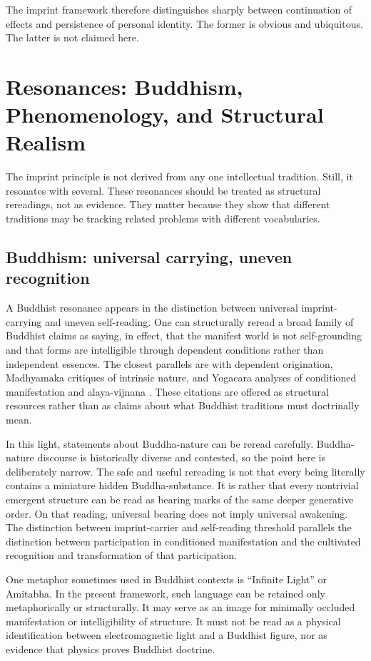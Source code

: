 \documentclass[12pt]{article}
\begin{document}
The imprint framework therefore distinguishes sharply between continuation of effects and persistence of personal identity. The former is obvious and ubiquitous. The latter is not claimed here.

\section{Resonances: Buddhism, Phenomenology, and Structural Realism}

The imprint principle is not derived from any one intellectual tradition. Still, it resonates with several. These resonances should be treated as structural rereadings, not as evidence. They matter because they show that different traditions may be tracking related problems with different vocabularies.

\subsection{Buddhism: universal carrying, uneven recognition}

A Buddhist resonance appears in the distinction between universal imprint-carrying and uneven self-reading. One can structurally reread a broad family of Buddhist claims as saying, in effect, that the manifest world is not self-grounding and that forms are intelligible through dependent conditions rather than independent essences. The closest parallels are with dependent origination, Madhyamaka critiques of intrinsic nature, and Yogacara analyses of conditioned manifestation and alaya-vijnana \cite{Lusthaus2002,Waldron2003,Garfield2002}. These citations are offered as structural resources rather than as claims about what Buddhist traditions must doctrinally mean.

In this light, statements about Buddha-nature can be reread carefully. Buddha-nature discourse is historically diverse and contested, so the point here is deliberately narrow. The safe and useful rereading is not that every being literally contains a miniature hidden Buddha-substance. It is rather that every nontrivial emergent structure can be read as bearing marks of the same deeper generative order. On that reading, universal bearing does not imply universal awakening. The distinction between imprint-carrier and self-reading threshold parallels the distinction between participation in conditioned manifestation and the cultivated recognition and transformation of that participation.

One metaphor sometimes used in Buddhist contexts is ``Infinite Light'' or Amitabha. In the present framework, such language can be retained only metaphorically or structurally. It may serve as an image for minimally occluded manifestation or intelligibility of structure. It must not be read as a physical identification between electromagnetic light and a Buddhist figure, nor as evidence that physics proves Buddhist doctrine.
\end{document}
